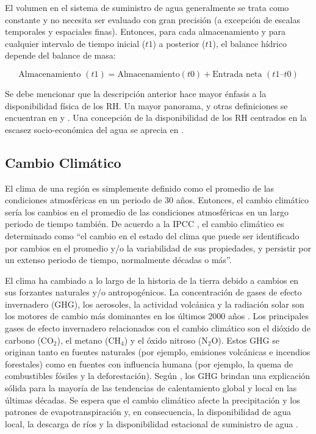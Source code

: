 \documentclass[12pt]{article}
\begin{document}
El volumen en el sistema de suministro de agua generalmente se trata como constante y no necesita ser evaluado con gran precisión (a excepción de escalas temporales y espaciales finas). Entonces, para cada almacenamiento y para cualquier intervalo de tiempo inicial ($t1$) a posterior ($t1$), el balance hídrico depende del balance de masa:

\begin{equation}
 \text{Almacenamiento }(t1) = \text{Almacenamiento} (t0) + \text{Entrada neta }(t1 – t0)
\label{equ:waterBalance_By_WMO}
\end{equation}

Se debe mencionar que la descripción anterior hace mayor énfasis a la disponibilidad física de los RH. Un mayor panorama, y otras definiciones se encuentran en \citet{xu2017water} y \citet{juniati2018proposing}. Una concepción de la disponibilidad de los RH centrados en la escasez socio-económica del agua se aprecia en \citet{sullivan2003water}.

\subsection{Cambio Climático}

El clima de una región es simplemente definido como el promedio de las condiciones atmosféricas en un periodo de 30 años. Entonces, el cambio climático sería los cambios en el promedio de las condiciones atmosféricas en un largo periodo de tiempo también. De acuerdo a la IPCC \citep{IPCC2007}, el cambio climático es determinado como ``el cambio en el estado del clima que puede ser identificado por cambios en el promedio y/o la variabilidad de sus propiedades, y persistir por un extenso periodo de tiempo, normalmente décadas o más”.

El clima ha cambiado a lo largo de la historia de la tierra debido a cambios en sus forzantes naturales y/o antropogénicos. La concentración de gases de efecto invernadero (GHG), los aerosoles, la actividad volcánica y la radiación solar son los motores de cambio más dominantes en los últimos 2000 años \citep{NRC2006}. Los principales gases de efecto invernadero relacionados con el cambio climático son el dióxido de carbono (CO$_{2}$), el metano (CH$_{4}$) y el óxido nitroso (N$_{2}$O). Estos GHG se originan tanto en fuentes naturales (por ejemplo, emisiones volcánicas e incendios forestales) como en fuentes con influencia humana (por ejemplo, la quema de combustibles fósiles y la deforestación). Según \citet{Solomon2007}, los GHG brindan una explicación sólida para la mayoría de las tendencias de calentamiento global y local en las últimas décadas. Se espera que el cambio climático afecte la precipitación y los patrones de evapotranspiración \citep{Tsanis2011} y, en consecuencia, la disponibilidad de agua local, la descarga de ríos y la disponibilidad estacional de suministro de agua \citep{Arnell2011}. 
\end{document}
